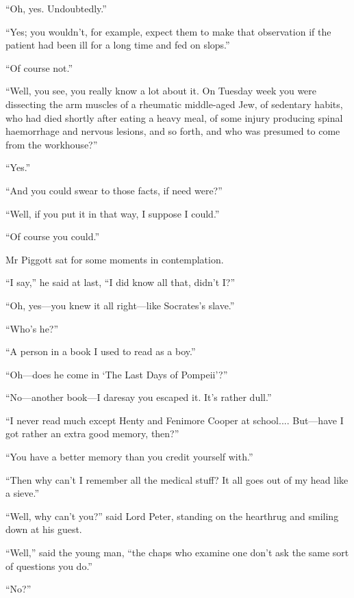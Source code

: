\enquote{Oh, yes. Undoubtedly.}

\enquote{Yes; you wouldn’t, for example, expect them to make that observation if the patient had been ill for a long time and fed on slops.}

\enquote{Of course not.}

\enquote{Well, you see, you really know a lot about it. On Tuesday week you were dissecting the arm muscles of a rheumatic middle-aged Jew, of sedentary habits, who had died shortly after eating a heavy meal, of some injury producing spinal haemorrhage and nervous lesions, and so forth, and who was presumed to come from the workhouse?}

\enquote{Yes.}

\enquote{And you could swear to those facts, if need were?}

\enquote{Well, if you put it in that way, I suppose I could.}

\enquote{Of course you could.}

Mr Piggott sat for some moments in contemplation.

\enquote{I say,} he said at last, \enquote{I did know all that, didn’t I?}

\enquote{Oh, yes\allowbreak---\allowbreak you knew it all right\allowbreak---\allowbreak like Socrates’s slave.}

\enquote{Who’s he?}

\enquote{A person in a book I used to read as a boy.}

“Oh\allowbreak---\allowbreak does he come in ‘The Last Days of Pompeii’?”

\enquote{No\allowbreak---\allowbreak another book\allowbreak---\allowbreak I daresay you escaped it. It’s rather dull.}

\enquote{I never read much except Henty and Fenimore Cooper at school.... But\allowbreak---\allowbreak have I got rather an extra good memory, then?}

\enquote{You have a better memory than you credit yourself with.}

\enquote{Then why can’t I remember all the medical stuff? It all goes out of my head like a sieve.}

\enquote{Well, why can’t you?} said Lord Peter, standing on the hearthrug and smiling down at his guest.

\enquote{Well,} said the young man, \enquote{the chaps who examine one don’t ask the same sort of questions you do.}

\enquote{No?}

